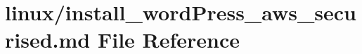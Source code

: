 \hypertarget{install__wordPress__aws__securised_8md}{}\section{linux/install\+\_\+word\+Press\+\_\+aws\+\_\+securised.md File Reference}
\label{install__wordPress__aws__securised_8md}

